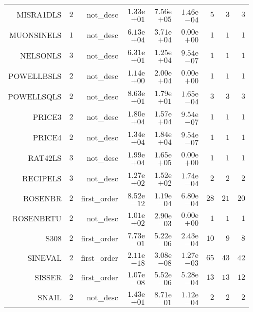 \begin{longtable}{rrrrrrrrr}
MISRA1DLS & \(     2\) & not\_desc & \( 1.33\)e\(+01\) & \( 7.56\)e\(+05\) & \( 1.46\)e\(-04\) & \(     5\) & \(     3\) & \(     3\) \\
MUONSINELS & \(     1\) & not\_desc & \( 6.13\)e\(+04\) & \( 3.71\)e\(+04\) & \( 0.00\)e\(+00\) & \(     1\) & \(     1\) & \(     1\) \\
NELSONLS & \(     3\) & not\_desc & \( 6.31\)e\(+01\) & \( 1.25\)e\(+04\) & \( 9.54\)e\(-07\) & \(     1\) & \(     1\) & \(     1\) \\
POWELLBSLS & \(     2\) & not\_desc & \( 1.14\)e\(+00\) & \( 2.00\)e\(+04\) & \( 0.00\)e\(+00\) & \(     1\) & \(     1\) & \(     1\) \\
POWELLSQLS & \(     2\) & not\_desc & \( 8.63\)e\(+01\) & \( 1.79\)e\(+01\) & \( 1.65\)e\(-04\) & \(     3\) & \(     3\) & \(     3\) \\
PRICE3 & \(     2\) & not\_desc & \( 1.80\)e\(+04\) & \( 1.57\)e\(+04\) & \( 9.54\)e\(-07\) & \(     1\) & \(     1\) & \(     1\) \\
PRICE4 & \(     2\) & not\_desc & \( 1.34\)e\(+04\) & \( 1.84\)e\(+04\) & \( 9.54\)e\(-07\) & \(     1\) & \(     1\) & \(     1\) \\
RAT42LS & \(     3\) & not\_desc & \( 1.99\)e\(+04\) & \( 1.65\)e\(+05\) & \( 0.00\)e\(+00\) & \(     1\) & \(     1\) & \(     1\) \\
RECIPELS & \(     3\) & not\_desc & \( 1.27\)e\(+02\) & \( 1.52\)e\(+02\) & \( 1.74\)e\(-04\) & \(     2\) & \(     2\) & \(     2\) \\
ROSENBR & \(     2\) & first\_order & \( 8.52\)e\(-12\) & \( 1.19\)e\(-04\) & \( 6.80\)e\(-04\) & \(    28\) & \(    21\) & \(    20\) \\
ROSENBRTU & \(     2\) & not\_desc & \( 1.01\)e\(+02\) & \( 2.90\)e\(-03\) & \( 0.00\)e\(+00\) & \(     1\) & \(     1\) & \(     1\) \\
S308 & \(     2\) & first\_order & \( 7.73\)e\(-01\) & \( 5.22\)e\(-06\) & \( 2.43\)e\(-04\) & \(    10\) & \(     9\) & \(     8\) \\
SINEVAL & \(     2\) & first\_order & \( 2.11\)e\(-18\) & \( 3.08\)e\(-08\) & \( 1.27\)e\(-03\) & \(    65\) & \(    43\) & \(    42\) \\
SISSER & \(     2\) & first\_order & \( 1.07\)e\(-08\) & \( 5.52\)e\(-06\) & \( 5.28\)e\(-04\) & \(    13\) & \(    13\) & \(    12\) \\
SNAIL & \(     2\) & not\_desc & \( 1.43\)e\(+01\) & \( 8.71\)e\(-01\) & \( 1.12\)e\(-04\) & \(     2\) & \(     2\) & \(     2\) \\

\end{longtable}
